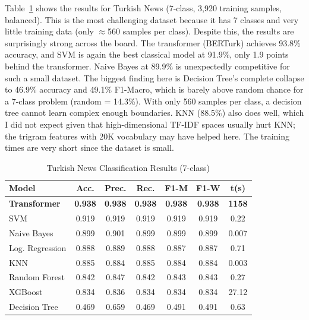 \documentclass[conference]{IEEEtran}
\begin{document}
Table~\ref{tab:trnews_results} shows the results for Turkish News (7-class, 3,920 training
samples, balanced). This is the most challenging dataset because it has 7 classes and
very little training data (only $\approx$560 samples per class). Despite this, the results
are surprisingly strong across the board. The transformer (BERTurk) achieves 93.8\%
accuracy, and SVM is again the best classical model at 91.9\%, only 1.9 points behind
the transformer. Naive Bayes at 89.9\% is unexpectedly competitive for such a small dataset.
The biggest finding here is Decision Tree's complete collapse to 46.9\% accuracy and 49.1\%
F1-Macro, which is barely above random chance for a 7-class problem (random = 14.3\%).
With only 560 samples per class, a decision tree cannot learn complex enough boundaries.
KNN (88.5\%) also does well, which I did not expect given that high-dimensional TF-IDF
spaces usually hurt KNN; the trigram features with 20K vocabulary may have helped here.
The training times are very short since the dataset is small.

\begin{table}[htbp]
	\caption{Turkish News Classification Results (7-class)}
	\label{tab:trnews_results}
	\begin{center}
		\footnotesize
		\renewcommand{\arraystretch}{1.2}
		\setlength{\tabcolsep}{4pt}
		\begin{tabular}{lcccccc}
			\toprule
			\rowcolor{headerblue}
			\color{white}\textbf{Model} & \color{white}\textbf{Acc.} & \color{white}\textbf{Prec.} & \color{white}\textbf{Rec.} & \color{white}\textbf{F1-M} & \color{white}\textbf{F1-W} & \color{white}\textbf{t(s)} \\
			\midrule
			\textbf{Transformer} & \textbf{0.938} & \textbf{0.938} & \textbf{0.938} & \textbf{0.938} & \textbf{0.938} & \textbf{1158} \\
			SVM             & 0.919 & 0.919 & 0.919 & 0.919 & 0.919 & 0.22 \\
			Naive Bayes     & 0.899 & 0.901 & 0.899 & 0.899 & 0.899 & 0.007 \\
			Log. Regression & 0.888 & 0.889 & 0.888 & 0.887 & 0.887 & 0.71 \\
			KNN             & 0.885 & 0.884 & 0.885 & 0.884 & 0.884 & 0.003 \\
			Random Forest   & 0.842 & 0.847 & 0.842 & 0.843 & 0.843 & 0.27 \\
			XGBoost         & 0.834 & 0.836 & 0.834 & 0.834 & 0.834 & 27.12 \\
			Decision Tree   & 0.469 & 0.659 & 0.469 & 0.491 & 0.491 & 0.63 \\
			\bottomrule
		\end{tabular}
	\end{center}
\end{table}
\end{document}
